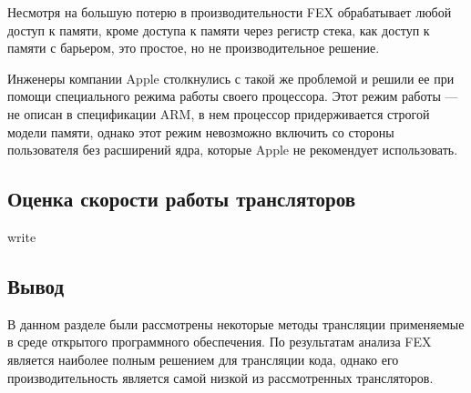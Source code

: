 Несмотря на большую потерю в производительности FEX обрабатывает любой доступ к памяти, кроме доступа к памяти через регистр стека, как доступ к памяти с барьером, это простое, но не производительное решение.

Инженеры компании Apple столкнулись с такой же проблемой и решили ее при помощи специального режима работы своего процессора. Этот режим работы --- не описан в спецификации ARM, в нем процессор придерживается строгой модели памяти, однако этот режим невозможно включить со стороны пользователя без расширений ядра, которые Apple не рекомендует использовать.

\subsection{Оценка скорости работы трансляторов}

write

\subsection{Вывод}

В данном разделе были рассмотрены некоторые методы трансляции применяемые в среде открытого программного обеспечения. По результатам анализа FEX является наиболее полным решением для трансляции кода, однако его производительность является самой низкой из рассмотренных трансляторов.


